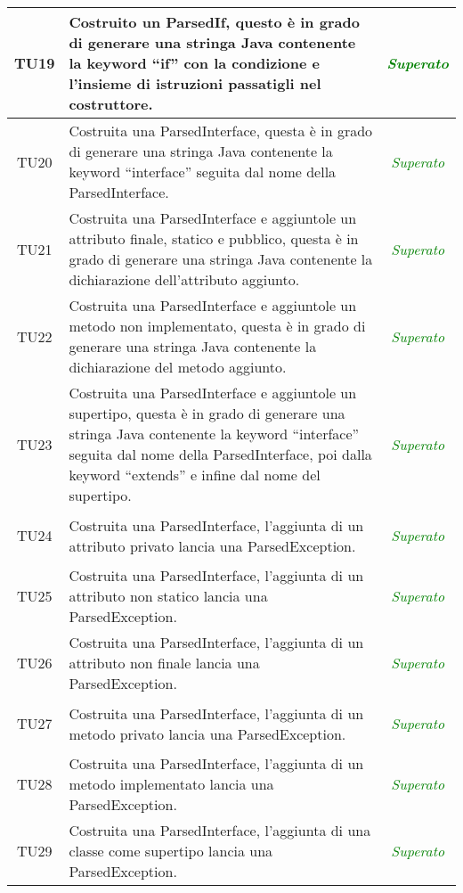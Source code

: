 \begin{longtable}{|c|>{}m{8cm}|c|}
\hypertarget{TU19}{TU19} & Costruito un ParsedIf, questo è in grado di generare una stringa Java contenente la keyword ``if'' con la condizione e l'insieme di istruzioni passatigli nel costruttore. & \textcolor{Green}{\textit{Superato}}\\ \hline
\hypertarget{TU20}{TU20} & Costruita una ParsedInterface, questa è in grado di generare una stringa Java contenente la keyword ``interface'' seguita dal nome della ParsedInterface. & \textcolor{Green}{\textit{Superato}}\\ \hline
\hypertarget{TU21}{TU21} & Costruita una ParsedInterface e aggiuntole un attributo finale, statico e pubblico, questa è in grado di generare una stringa Java contenente la dichiarazione dell'attributo aggiunto. & \textcolor{Green}{\textit{Superato}}\\ \hline
\hypertarget{TU22}{TU22} & Costruita una ParsedInterface e aggiuntole un metodo non implementato, questa è in grado di generare una stringa Java contenente la dichiarazione del metodo aggiunto. & \textcolor{Green}{\textit{Superato}}\\ \hline
\hypertarget{TU23}{TU23} & Costruita una ParsedInterface e aggiuntole un supertipo, questa è in grado di generare una stringa Java contenente la keyword ``interface'' seguita dal nome della ParsedInterface, poi dalla keyword ``extends'' e infine dal nome del supertipo. & \textcolor{Green}{\textit{Superato}}\\ \hline
\hypertarget{TU24}{TU24} & Costruita una ParsedInterface, l'aggiunta di un attributo privato lancia una ParsedException. & \textcolor{Green}{\textit{Superato}}\\ \hline
\hypertarget{TU25}{TU25} & Costruita una ParsedInterface, l'aggiunta di un attributo non statico lancia una ParsedException. & \textcolor{Green}{\textit{Superato}}\\ \hline
\hypertarget{TU26}{TU26} & Costruita una ParsedInterface, l'aggiunta di un attributo non finale lancia una ParsedException. & \textcolor{Green}{\textit{Superato}}\\ \hline
\hypertarget{TU27}{TU27} & Costruita una ParsedInterface, l'aggiunta di un metodo privato lancia una ParsedException. & \textcolor{Green}{\textit{Superato}}\\ \hline
\hypertarget{TU28}{TU28} & Costruita una ParsedInterface, l'aggiunta di un metodo implementato lancia una ParsedException. & \textcolor{Green}{\textit{Superato}}\\ \hline
\hypertarget{TU29}{TU29} & Costruita una ParsedInterface, l'aggiunta di una classe come supertipo lancia una ParsedException. & \textcolor{Green}{\textit{Superato}}\\ \hline

\end{longtable}
